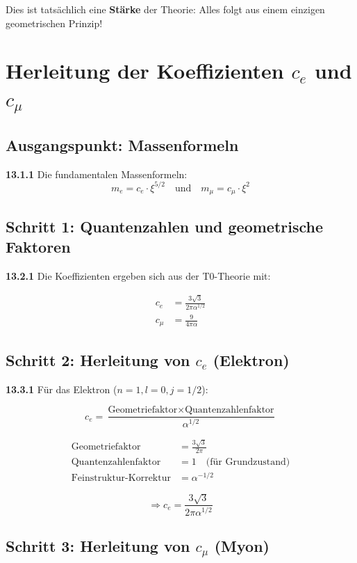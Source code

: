 Dies ist tatsächlich eine \textbf{Stärke} der Theorie: Alles folgt aus einem einzigen geometrischen Prinzip!


\section{Herleitung der Koeffizienten $c_e$ und $c_\mu$}

\subsection{Ausgangspunkt: Massenformeln}

\noindent \textbf{13.1.1} Die fundamentalen Massenformeln:
\[
m_e = c_e \cdot \xi^{5/2} \quad \text{und} \quad m_\mu = c_\mu \cdot \xi^2
\]

\subsection{Schritt 1: Quantenzahlen und geometrische Faktoren}

\noindent \textbf{13.2.1} Die Koeffizienten ergeben sich aus der T0-Theorie mit:

\begin{align*}
	c_e &= \frac{3\sqrt{3}}{2\pi\alpha^{1/2}} \\
	c_\mu &= \frac{9}{4\pi\alpha}
\end{align*}

\subsection{Schritt 2: Herleitung von $c_e$ (Elektron)}

\noindent \textbf{13.3.1} Für das Elektron ($n=1, l=0, j=1/2$):

\[
c_e = \frac{\text{Geometriefaktor} \times \text{Quantenzahlenfaktor}}{\alpha^{1/2}}
\]

\begin{align*}
	\text{Geometriefaktor} &= \frac{3\sqrt{3}}{2\pi} \\
	\text{Quantenzahlenfaktor} &= 1 \quad \text{(für Grundzustand)} \\
	\text{Feinstruktur-Korrektur} &= \alpha^{-1/2}
\end{align*}

\[
\Rightarrow c_e = \frac{3\sqrt{3}}{2\pi\alpha^{1/2}}
\]

\subsection{Schritt 3: Herleitung von $c_\mu$ (Myon)}

